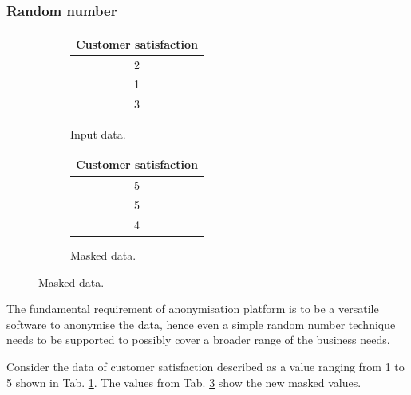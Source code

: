 \documentclass[a4paper,twoside,12pt]{book}
\begin{document}
\subsubsection{Random number}


\begin{figure}
\centering
\caption{Random number.}
\begin{subfigure}{.4\textwidth}
	\centering
	\caption{Input data.}
	\label{id:tab:random_number_raw}
	\begin{tabular}{c}
	\toprule
	Customer satisfaction \\ \midrule
	2                     \\
	1                     \\
	3                     \\ \bottomrule
	\end{tabular}
\end{subfigure}
\begin{subfigure}{.4\textwidth}
\centering
\caption{Masked data.}
\label{id:tab:random_number_masked}
\begin{tabular}{c}
\toprule
Customer satisfaction \\ \midrule
5                     \\
5                     \\
4                     \\ \bottomrule
\end{tabular}
\end{subfigure}
\end{figure}

The fundamental requirement of anonymisation platform is to be a versatile software to anonymise the data, hence even a simple random number technique needs to be supported to possibly cover a broader range of the business needs.

Consider the data of customer satisfaction described as a value ranging from 1 to 5 shown in Tab. \ref{id:tab:random_number_raw}.
%
%
The values from Tab. \ref{id:tab:random_number_masked} show the new masked values.
%
\end{document}
